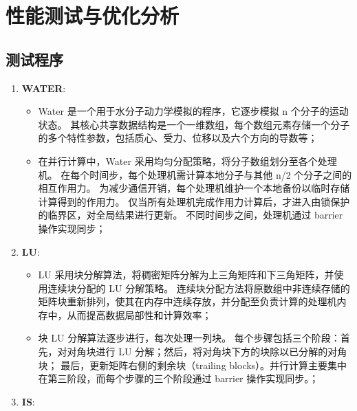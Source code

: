 \chapter{性能测试与优化分析}\label{chap:experiments}{
    \section{测试程序}


    \begin{enumerate}[leftmargin=1em, align=left]
        \item \textbf{WATER}:
              \begin{itemize}[leftmargin=*, nosep]
                  \item Water 是一个用于水分子动力学模拟的程序，它逐步模拟 n 个分子的运动状态。
                        其核心共享数据结构是一个一维数组，每个数组元素存储一个分子的多个特性参数，包括质心、受力、位移以及六个方向的导数等；
                  \item 在并行计算中，Water 采用均匀分配策略，将分子数组划分至各个处理机。
                        在每个时间步，每个处理机需计算本地分子与其他 n/2 个分子之间的相互作用力。
                        为减少通信开销，每个处理机维护一个本地备份以临时存储计算得到的作用力。
                        仅当所有处理机完成作用力计算后，才进入由锁保护的临界区，对全局结果进行更新。
                        不同时间步之间，处理机通过 barrier 操作实现同步；
              \end{itemize}
        \item \textbf{LU}:
              \begin{itemize}[leftmargin=*, nosep]
                  \item LU 采用块分解算法，将稠密矩阵分解为上三角矩阵和下三角矩阵，并使用连续块分配的 LU 分解策略。
                        连续块分配方法将原数组中非连续存储的矩阵块重新排列，使其在内存中连续存放，并分配至负责计算的处理机内存中，从而提高数据局部性和计算效率；
                  \item 块 LU 分解算法逐步进行，每次处理一列块。
                        每个步骤包括三个阶段：首先，对对角块进行 LU 分解；然后，将对角块下方的块除以已分解的对角块；
                        最后，更新矩阵右侧的剩余块（trailing blocks）。并行计算主要集中在第三阶段，而每个步骤的三个阶段通过 barrier 操作实现同步。；
              \end{itemize}
        \item \textbf{IS}:
              \begin{itemize}[leftmargin=*, nosep]

\end{itemize}
\end{enumerate}}
